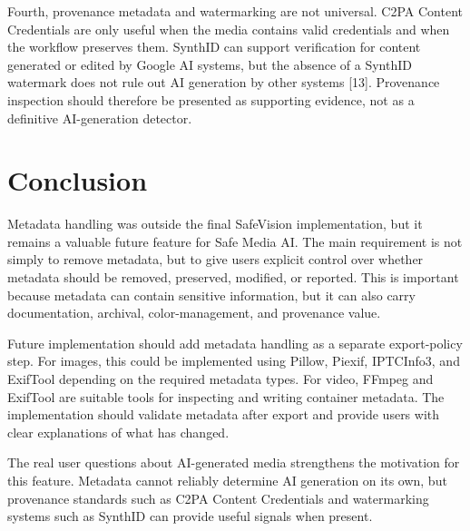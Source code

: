 Fourth, provenance metadata and watermarking are not universal. C2PA Content Credentials are only useful when the media contains valid credentials and when the workflow preserves them. SynthID can support verification for content generated or edited by Google AI systems, but the absence of a SynthID watermark does not rule out AI generation by other systems [13]. Provenance inspection should therefore be presented as supporting evidence, not as a definitive AI-generation detector.

\section{Conclusion}
Metadata handling was outside the final SafeVision implementation, but it remains a valuable future feature for Safe Media AI. The main requirement is not simply to remove metadata, but to give users explicit control over whether metadata should be removed, preserved, modified, or reported. This is important because metadata can contain sensitive information, but it can also carry documentation, archival, color-management, and provenance value.

Future implementation should add metadata handling as a separate export-policy step. For images, this could be implemented using Pillow, Piexif, IPTCInfo3, and ExifTool depending on the required metadata types. For video, FFmpeg and ExifTool are suitable tools for inspecting and writing container metadata. The implementation should validate metadata after export and provide users with clear explanations of what has changed.

The real user questions about AI-generated media strengthens the motivation for this feature. Metadata cannot reliably determine AI generation on its own, but provenance standards such as C2PA Content Credentials and watermarking systems such as SynthID can provide useful signals when present.


